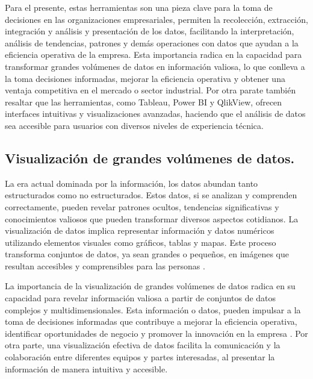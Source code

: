 \documentclass[
  11pt,
  bookmarksnumbered]{article}
\begin{document}
Para el presente, estas herramientas son una pieza clave para la toma de decisiones en las organizaciones empresariales, permiten la recolección, extracción, integración y análisis y presentación de los datos, facilitando la interpretación, análisis de tendencias, patrones y demás operaciones con datos que ayudan a la eficiencia operativa de la empresa.
Esta importancia radica en la capacidad para transformar grandes volúmenes de datos en información valiosa, lo que conlleva a la toma decisiones informadas, mejorar la eficiencia operativa y obtener una ventaja competitiva en el mercado o sector industrial.
Por otra parate también resaltar que las herramientas, como Tableau, Power BI y QlikView, ofrecen interfaces intuitivas y visualizaciones avanzadas, haciendo que el análisis de datos sea accesible para usuarios con diversos niveles de experiencia técnica.

\hypertarget{visualizaciuxf3n-de-grandes-voluxfamenes-de-datos.}{%
\subsection{Visualización de grandes volúmenes de datos.}\label{visualizaciuxf3n-de-grandes-voluxfamenes-de-datos.}}

La era actual dominada por la información, los datos abundan tanto estructurados como no estructurados.
Estos datos, si se analizan y comprenden correctamente, pueden revelar patrones ocultos, tendencias significativas y conocimientos valiosos que pueden transformar diversos aspectos cotidianos.
La visualización de datos implica representar información y datos numéricos utilizando elementos visuales como gráficos, tablas y mapas.
Este proceso transforma conjuntos de datos, ya sean grandes o pequeños, en imágenes que resultan accesibles y comprensibles para las personas \textcite{javatpoint2023data}.

La importancia de la visualización de grandes volúmenes de datos radica en su capacidad para revelar información valiosa a partir de conjuntos de datos complejos y multidimensionales.
Esta información o datos, pueden impulsar a la toma de decisiones informadas que contribuye a mejorar la eficiencia operativa, identificar oportunidades de negocio y promover la innovación en la empresa \textcite{shneiderman1996eyes}.
Por otra parte, una visualización efectiva de datos facilita la comunicación y la colaboración entre diferentes equipos y partes interesadas, al presentar la información de manera intuitiva y accesible.
\end{document}
